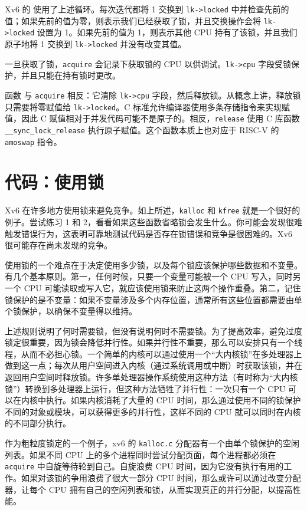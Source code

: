 Xv6 的   使用了上述循环。每次迭代都将 1 交换到 \lstinline{lk->locked} 中并检查先前的值；如果先前的值为零，则表示我们已经获取了锁，并且交换操作会将 \lstinline{lk->locked} 设置为 1。如果先前的值为 1，则表示其他 CPU 持有了该锁，并且我们原子地将 1 交换到 \lstinline{lk->locked} 并没有改变其值。

一旦获取了锁，\lstinline{acquire} 会记录下获取锁的 CPU 以供调试。\lstinline{lk->cpu} 字段受锁保护，并且只能在持有锁时更改。

函数   与 \lstinline{acquire} 相反：它清除 \lstinline{lk->cpu} 字段，然后释放锁。从概念上讲，释放锁只需要将零赋值给 \lstinline{lk->locked}。C 标准允许编译器使用多条存储指令来实现赋值，因此 C 赋值相对于并发代码可能不是原子的。相反，\lstinline{release} 使用 C 库函数 \lstinline{__sync_lock_release} 执行原子赋值。这个函数本质上也对应于 RISC-V 的 \lstinline{amoswap} 指令。

\section{代码：使用锁}
Xv6 在许多地方使用锁来避免竞争。如上所述，\lstinline{kalloc}  和 \lstinline{kfree}  就是一个很好的例子。尝试练习 1 和 2，看看如果这些函数省略锁会发生什么。你可能会发现很难触发错误行为，这表明可靠地测试代码是否存在锁错误和竞争是很困难的。Xv6 很可能存在尚未发现的竞争。

使用锁的一个难点在于决定使用多少锁，以及每个锁应该保护哪些数据和不变量。有几个基本原则。第一，任何时候，只要一个变量可能被一个 CPU 写入，同时另一个 CPU 可能读取或写入它，就应该使用锁来防止这两个操作重叠。第二，记住锁保护的是不变量：如果不变量涉及多个内存位置，通常所有这些位置都需要由单个锁保护，以确保不变量得以维持。

上述规则说明了何时需要锁，但没有说明何时不需要锁。为了提高效率，避免过度锁定很重要，因为锁会降低并行性。如果并行性不重要，那么可以安排只有一个线程，从而不必担心锁。一个简单的内核可以通过使用一个“大内核锁”在多处理器上做到这一点；每次从用户空间进入内核（通过系统调用或中断）时获取该锁，并在返回用户空间时释放锁。许多单处理器操作系统使用这种方法（有时称为“大内核锁”）转换到多处理器上运行，但这种方法牺牲了并行性：一次只有一个 CPU 可以在内核中执行。如果内核消耗了大量的 CPU 时间，那么通过使用不同的锁保护不同的对象或模块，可以获得更多的并行性，这样不同的 CPU 就可以同时在内核的不同部分执行。

作为粗粒度锁定的一个例子，xv6 的 \lstinline{kalloc.c} 分配器有一个由单个锁保护的空闲列表。如果不同 CPU 上的多个进程同时尝试分配页面，每个进程都必须在 {\tt acquire} 中自旋等待轮到自己。自旋浪费 CPU 时间，因为它没有执行有用的工作。如果对该锁的争用浪费了很大一部分 CPU 时间，那么或许可以通过改变分配器，让每个 CPU 拥有自己的空闲列表和锁，从而实现真正的并行分配，以提高性能。

